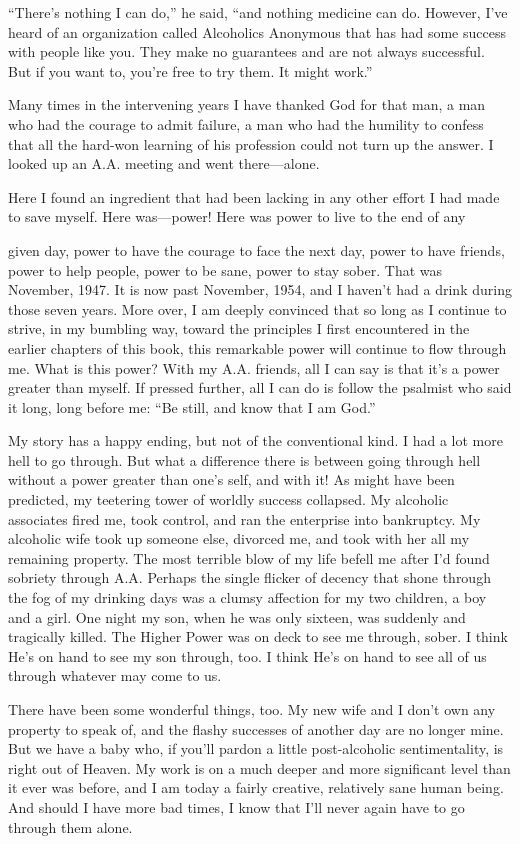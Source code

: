 “There’s nothing I can do,” he said, “and nothing medicine can do. However, I’ve heard of an organization called Alcoholics Anonymous that has had some success with people like you. They make no guarantees and are not always successful. But if you want to, you’re free to try them. It might work.”

Many times in the intervening years I have thanked God for that man, a man who had the courage to admit failure, a man who had the humility to confess that all the hard-won learning of his profession could not turn up the answer. I looked up an A.A. meeting and went there—alone.

Here I found an ingredient that had been lacking in any other effort I had made to save myself. Here was—power! Here was power to live to the end of any

given day, power to have the courage to face the next day, power to have friends, power to help people, power to be sane, power to stay sober. That was November, 1947. It is now past November, 1954, and I haven’t had a drink during those seven years. More over, I am deeply convinced that so long as I continue to strive, in my bumbling way, toward the principles I first encountered in the earlier chapters of this book, this remarkable power will continue to flow through me. What is this power? With my A.A. friends, all I can say is that it’s a power greater than myself. If pressed further, all I can do is follow the psalmist who said it long, long before me: “Be still, and know that I am God.”

My story has a happy ending, but not of the conventional kind. I had a lot more hell to go through. But what a difference there is between going through hell without a power greater than one’s self, and with it! As might have been predicted, my teetering tower of worldly success collapsed. My alcoholic associates fired me, took control, and ran the enterprise into bankruptcy. My alcoholic wife took up someone else, divorced me, and took with her all my remaining property. The most terrible blow of my life befell me after I’d found sobriety through A.A. Perhaps the single flicker of decency that shone through the fog of my drinking days was a clumsy affection for my two children, a boy and a girl. One night my son, when he was only sixteen, was suddenly and tragically killed. The Higher Power was on deck to see me through, sober. I think He’s on hand to see my son through, too. I think He’s on hand to see all of us through whatever may come to us.

       There have been some wonderful things, too. My new wife and I don’t own any property to speak of, and the flashy successes of another day are no longer mine. But we have a baby who, if you’ll pardon a little post-alcoholic sentimentality, is right out of Heaven. My work is on a much deeper and more significant level than it ever was before, and I am today a fairly creative, relatively sane human being. And should I have more bad times, I know that I’ll never again have to go through them alone.
